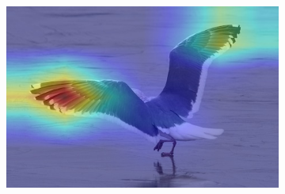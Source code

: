 \documentclass[a4paper,12pt]{report}
\begin{document}
\begin{figure}[htbp]
\begin{subfigure}[b]{0.22\textwidth}
        \caption{}
    \end{subfigure}
    \hfill
    \begin{subfigure}[b]{0.22\textwidth}
        \includegraphics[width=\textwidth]{images/interpretability/vgg/bird12.jpeg}
        \caption{}
    \end{subfigure}
    
    \vspace{0.3em}
    

\end{figure}
\end{document}

